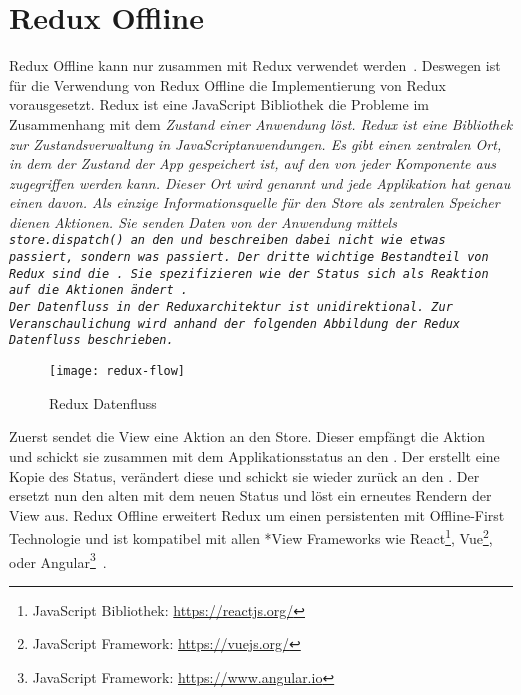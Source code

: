 \section{\label{sub:reduxoffline}Redux Offline}
Redux Offline kann nur zusammen mit Redux verwendet werden~\cite{redux-req}. Deswegen ist für die Verwendung von Redux Offline die Implementierung von Redux vorausgesetzt.
%
%
Redux ist eine JavaScript Bibliothek die Probleme im Zusammenhang mit dem \it{Zustand} einer Anwendung löst.
Redux ist eine Bibliothek zur Zustandsverwaltung in JavaScriptanwendungen.
Es gibt einen zentralen Ort, in dem der \it{Zustand} der App gespeichert ist, auf den von jeder Komponente aus zugegriffen werden kann.
Dieser Ort wird  genannt und jede Applikation hat genau einen davon. 
Als einzige Informationsquelle für den Store als zentralen Speicher dienen Aktionen. 
Sie senden Daten von der Anwendung mittels \tt{store.dispatch()} an den  und beschreiben dabei nicht wie etwas passiert, sondern was passiert.
Der dritte wichtige Bestandteil von Redux sind die . Sie spezifizieren wie der Status sich als Reaktion auf die Aktionen ändert~\cite{redux}.\\
Der Datenfluss in der Reduxarchitektur ist unidirektional. Zur Veranschaulichung wird anhand der folgenden Abbildung der Redux Datenfluss beschrieben.
%
\begin{figure}[H]
  \centering
  \texttt{[image: redux-flow]}
  \grayRule
  \caption{Redux Datenfluss}
  \label{fig:rdx-dataflow}
\end{figure}
% 
Zuerst sendet die View eine Aktion an den Store. Dieser empfängt die Aktion und schickt sie zusammen mit dem Applikationsstatus an den .
Der  erstellt eine Kopie des Status, verändert diese und schickt sie wieder zurück an den . Der  ersetzt nun den alten mit dem neuen Status und löst ein erneutes Rendern der View aus.
% 
% 
Redux Offline erweitert Redux um einen persistenten  mit Offline-First Technologie und  ist kompatibel mit allen *View Frameworks wie React\footnote{JavaScript Bibliothek: \url{https://reactjs.org/}}, Vue\footnote{JavaScript Framework: \url{https://vuejs.org/}}, oder Angular\footnote{JavaScript Framework: \url{https://www.angular.io}}~\cite{redux-offline-compabilaty}.
